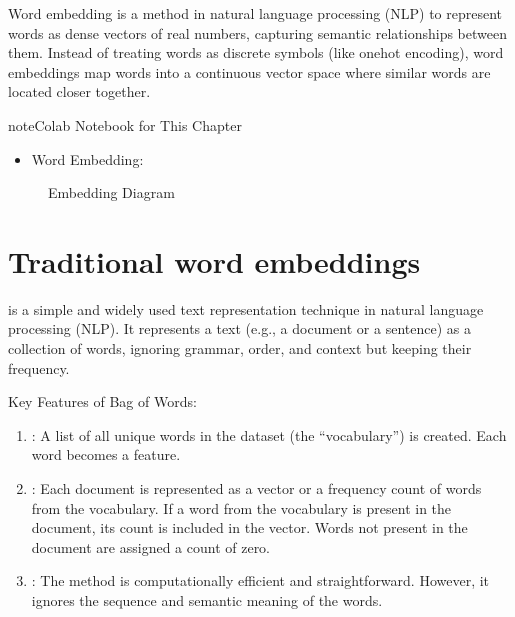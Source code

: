 \documentclass[letterpaper,11pt,english]{sphinxmanual}
\begin{document}
\sphinxAtStartPar
Word embedding is a method in natural language processing (NLP) to represent words as dense
vectors of real numbers, capturing semantic relationships between them. Instead of treating
words as discrete symbols (like one\sphinxhyphen{}hot encoding), word embeddings map words into a
continuous vector space where similar words are located closer together.

\begin{sphinxadmonition}{note}{Colab Notebook for This Chapter}
\begin{itemize}
\item {} 
\sphinxAtStartPar
Word Embedding: 

\end{itemize}
\end{sphinxadmonition}

\begin{figure}[htbp]
\centering
\capstart

\noindent{}
\caption{Embedding Diagram}\label{\detokenize{embedding:id3}}\label{\detokenize{embedding:fig-embedding}}\end{figure}


\section{Traditional word embeddings}
\label{\detokenize{embedding:traditional-word-embeddings}}
\sphinxAtStartPar
{} is a simple and widely used text representation technique in natural
language processing (NLP). It represents a text (e.g., a document or a sentence) as a collection
of words, ignoring grammar, order, and context but keeping their frequency.

\sphinxAtStartPar
Key Features of Bag of Words:
\begin{enumerate}
%
\item {} 
\sphinxAtStartPar
{}:
\sphinxhyphen{} A list of all unique words in the dataset (the “vocabulary”) is created.
\sphinxhyphen{} Each word becomes a feature.

\item {} 
\sphinxAtStartPar
{}:
\sphinxhyphen{} Each document is represented as a vector or a frequency count of words from the vocabulary.
\sphinxhyphen{} If a word from the vocabulary is present in the document, its count is included in the vector.
\sphinxhyphen{} Words not present in the document are assigned a count of zero.

\item {} 
\sphinxAtStartPar
{}:
\sphinxhyphen{} The method is computationally efficient and straightforward.
\sphinxhyphen{} However, it ignores the sequence and semantic meaning of the words.

\end{enumerate}
\end{document}
